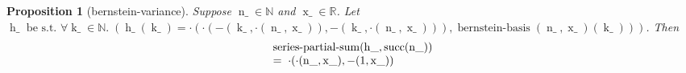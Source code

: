 \documentclass[11pt]{article}
\theoremstyle{plain}
\newtheorem{proposition}{Proposition}
\begin{document}
\begin{proposition}[bernstein-variance]
Suppose $\operatorname{n\_} \in \mathbb{N}$ and $\operatorname{x\_} \in \mathbb{R}$. Let $\operatorname{h\_} \text{ be s.t. } \forall \operatorname{k\_} \in \mathbb{N}.\; (\operatorname{h\_}(\operatorname{k\_}) = \cdot(\cdot(-(\operatorname{k\_}, \cdot(\operatorname{n\_}, \operatorname{x\_})), -(\operatorname{k\_}, \cdot(\operatorname{n\_}, \operatorname{x\_}))), \operatorname{bernstein\text{-}basis}(\operatorname{n\_}, \operatorname{x\_})(\operatorname{k\_})))$. Then
\begin{equation*}
\begin{array}{@{}l@{}} \operatorname{series\text{-}partial\text{-}sum}(\operatorname{h\_}, \operatorname{succ}(\operatorname{n\_})) \\ =\; \cdot(\cdot(\operatorname{n\_}, \operatorname{x\_}), -(1, \operatorname{x\_})) \end{array}
\end{equation*}

\end{proposition}
\end{document}
